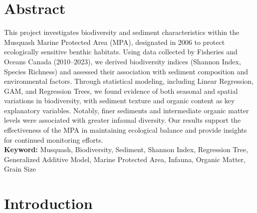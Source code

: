 \documentclass[12pt]{article}
\begin{document}
\newpage
\thispagestyle{empty} %

\section*{Abstract}

\qquad This project investigates biodiversity and sediment characteristics within the Musquash Marine Protected Area (MPA), designated in 2006 to protect ecologically sensitive benthic habitats. Using data collected by Fisheries and Oceans Canada (2010–2023), we derived biodiversity indices (Shannon Index, Species Richness) and assessed their association with sediment composition and environmental factors. Through statistical modeling, including Linear Regression, GAM, and Regression Trees, we found evidence of both seasonal and spatial variations in biodiversity, with sediment texture and organic content as key explanatory variables. Notably, finer sediments and intermediate organic matter levels were associated with greater infaunal diversity. Our results support the effectiveness of the MPA in maintaining ecological balance and provide insights for continued monitoring efforts.\\

\textbf{Keyword: }Musquash, Biodiversity, Sediment, Shannon Index, Regression Tree, Generalized Additive Model, Marine Protected Area, Infauna, Organic Matter, Grain Size



\newpage
\thispagestyle{empty}
\clearpage
\tableofcontents
\listoffigures
\listoftables
\thispagestyle{empty}
\clearpage
\setcounter{page}{1}





\section{Introduction}
\end{document}
